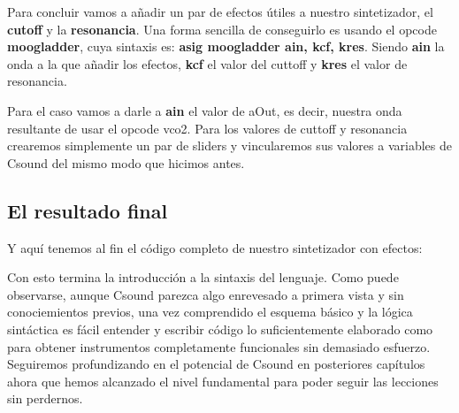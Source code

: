 Para concluir vamos a añadir un par de efectos útiles a nuestro sintetizador, el \textbf{cutoff} y la \textbf{resonancia}. Una forma sencilla de conseguirlo es usando el opcode \textbf{moogladder}, cuya sintaxis es: \textbf{asig moogladder ain, kcf, kres}. Siendo \textbf{ain} la onda a la que añadir los efectos, \textbf{kcf} el valor del cuttoff y \textbf{kres} el valor de resonancia.

Para el caso vamos a darle a \textbf{ain} el valor de aOut, es decir, nuestra onda resultante de usar el opcode vco2. Para los valores de cuttoff y resonancia crearemos simplemente un par de sliders y vincularemos sus valores a variables de Csound del mismo modo que hicimos antes.

\subsection{El resultado final}\label{sec:SinteCompleto}

Y aquí tenemos al fin el código completo de nuestro sintetizador con efectos:


Con esto termina la introducción a la sintaxis del lenguaje. Como puede observarse, aunque Csound parezca algo enrevesado a primera vista y sin conociemientos previos, una vez comprendido el esquema básico y la lógica sintáctica es fácil entender y escribir código lo suficientemente elaborado como para obtener instrumentos completamente funcionales sin demasiado esfuerzo.
Seguiremos profundizando en el potencial de Csound en posteriores capítulos ahora que hemos alcanzado el nivel fundamental para poder seguir las lecciones sin perdernos.
